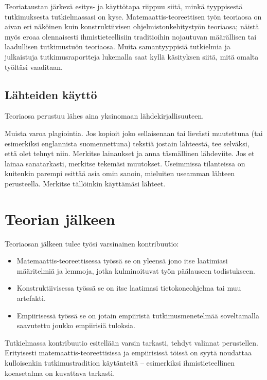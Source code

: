 \documentclass[utf8]{gradu3}
\begin{document}
Teoriataustan järkevä esitys- ja käyttötapa riippuu siitä, minkä
tyyppisestä tutkimuksesta tutkielmassasi on kyse.
Matemaattis-teoreettisen työn teoriaosa on aivan eri näköinen kuin
konstruktiivisen ohjelmistonkehitystyön teoriaosa; näistä myös eroaa
olennaisesti ihmistieteellisiin traditioihin nojautuvan määrällisen
tai laadullisen tutkimustuön teoriaosa.  Muita samantyyppisiä
tutkielmia ja julkaistuja tutkimusraportteja lukemalla saat kyllä
käsityksen siitä, mitä omalta työltäsi vaaditaan.

\subsection{Lähteiden käyttö}

Teoriaosa perustuu lähes aina yksinomaan lähdekirjallisuuteen.

Muista varoa plagiointia.  Jos kopioit joko sellaisenaan tai lievästi
muutettuna (tai esimerkiksi englannista suomennettuna) tekstiä jostain
lähteestä, tee selväksi, että olet tehnyt niin.  Merkitse lainaukset
ja anna täsmällinen lähdeviite.  Jos et lainaa sanatarkasti, merkitse
tekemäsi muutokset.  Useimmissa tilanteissa on kuitenkin parempi
esittää asia omin sanoin, mieluiten useamman lähteen perusteella.
Merkitse tällöinkin käyttämäsi lähteet.

\section{Teorian jälkeen}

Teoriaosan jälkeen tulee työsi varsinainen kontribuutio:
\begin{itemize}
\item Matemaattis-teoreettisessa työssä se on yleensä jono itse
  laatimiasi määritelmiä ja lemmoja, jotka kulminoituvat työn
  päälauseen todistukseen.
\item Konstruktiivisessa työssä se on itse laatimasi tietokoneohjelma
  tai muu artefakti.
\item Empiirisessä työssä se on jotain empiiristä tutkimusmenetelmää
  soveltamalla saavutettu joukko empiirisiä tuloksia.
\end{itemize}

Tutkielmassa kontribuutio esitellään varsin tarkasti, tehdyt valinnat
perustellen.  Erityisesti matemaattis-teoreettisissa ja empiirisissä
töissä on syytä noudattaa kulloisenkin tutkimustradition käytänteitä
-- esimerkiksi ihmistieteellinen koeasetalma on kuvattava tarkasti.
\end{document}
